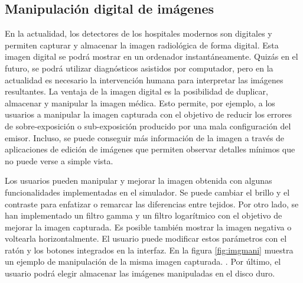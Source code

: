\subsection{Manipulación digital de imágenes}
\label{xray:ajustes}
En la actualidad, los detectores de los hospitales modernos son digitales y permiten capturar y almacenar la imagen radiológica de forma digital. Esta imagen digital se podrá mostrar en un ordenador instantáneamente. Quizás en el futuro, se podrá utilizar diagnósticos asistidos por computador, pero en la actualidad es necesario la intervención humana para interpretar las imágenes resultantes. La ventaja de la imagen digital es la posibilidad de duplicar, almacenar y manipular la imagen médica. Esto permite, por ejemplo, a los usuarios a manipular la imagen capturada con el objetivo de reducir los errores de sobre-exposición o sub-exposición producido por una mala configuración del emisor. Incluso, se puede conseguir más información de la imagen a través de aplicaciones de edición de imágenes que permiten observar detalles mínimos que no puede verse a simple vista.  

Los usuarios pueden manipular y mejorar la imagen obtenida con algunas funcionalidades implementadas en el simulador. Se puede cambiar el brillo y el contraste para enfatizar o remarcar las diferencias entre tejidos. Por otro lado, se han implementado un filtro gamma y un filtro logarítmico con el objetivo de mejorar la imagen capturada. Es posible también mostrar la imagen negativa o voltearla horizontalmente. El usuario puede modificar estos parámetros con el ratón y los botones integrados en la interfaz. En la figura \ref{fig:imgmani} muestra un ejemplo de manipulación de la misma imagen capturada. . Por último, el usuario podrá elegir almacenar las imágenes manipuladas en el disco duro.



